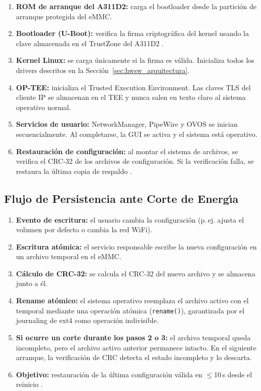 \begin{enumerate}
  \item \textbf{ROM de arranque del A311D2:} carga el bootloader desde la
    partici\'{o}n de arranque protegida del eMMC.
  \item \textbf{Bootloader (U-Boot):} verifica la firma criptogr\'{a}fica del
    kernel usando la clave almacenada en el TrustZone del A311D2 .
  \item \textbf{Kernel Linux:} se carga \'{u}nicamente si la firma es v\'{a}lida.
    Inicializa todos los drivers descritos en la
    Secci\'{o}n~\ref{sec:hwsw_arquitectura}.
  \item \textbf{OP-TEE:} inicializa el Trusted Execution Environment. Las claves
    TLS del cliente IP se almacenan en el TEE y nunca salen en texto claro al
    sistema operativo normal.
  \item \textbf{Servicios de usuario:} NetworkManager, PipeWire y OVOS se
    inician secuencialmente. Al completarse, la GUI se activa y el sistema
    est\'{a} operativo.
  \item \textbf{Restauraci\'{o}n de configuraci\'{o}n:} al montar el sistema
    de archivos, se verifica el CRC-32 de los archivos de configuraci\'{o}n.
    Si la verificaci\'{o}n falla, se restaura la \'{u}ltima copia de respaldo
    .
\end{enumerate}

\subsection{Flujo de Persistencia ante Corte de Energ\'{\i}a}

\begin{enumerate}
  \item \textbf{Evento de escritura:} el usuario cambia la configuraci\'{o}n
    (p.\,ej. ajusta el volumen por defecto o cambia la red WiFi).
  \item \textbf{Escritura at\'{o}mica:} el servicio responsable escribe la nueva
    configuraci\'{o}n en un archivo temporal en el eMMC.
  \item \textbf{C\'{a}lculo de CRC-32:} se calcula el CRC-32 del nuevo archivo
    y se almacena junto a \'{e}l.
  \item \textbf{Rename at\'{o}mico:} el sistema operativo reemplaza el archivo
    activo con el temporal mediante una operaci\'{o}n at\'{o}mica
    (\texttt{rename()}), garantizada por el journaling de ext4 como operaci\'{o}n
    indivisible.
  \item \textbf{Si ocurre un corte durante los pasos 2 o 3:} el archivo temporal
    queda incompleto, pero el archivo activo anterior permanece intacto. En el
    siguiente arranque, la verificaci\'{o}n de CRC detecta el estado incompleto
    y lo descarta.
  \item \textbf{Objetivo:} restauraci\'{o}n de la \'{u}ltima configuraci\'{o}n
    v\'{a}lida en $\leq$10\,s desde el reinicio .
\end{enumerate}
